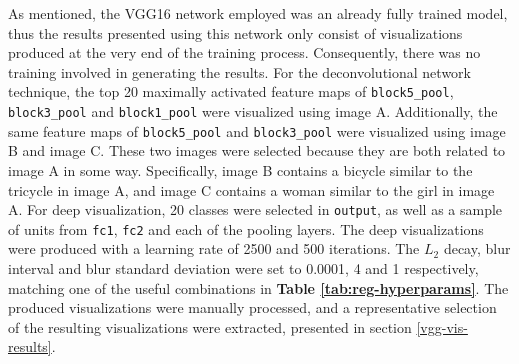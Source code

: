 \noindent As mentioned, the VGG16 network employed was an already fully trained model, thus the results presented using this network only consist of visualizations produced at the very end of the training process. Consequently, there was no training involved in generating the results. For the deconvolutional network technique, the top 20 maximally activated feature maps of \texttt{block5\_pool}, \texttt{block3\_pool} and \texttt{block1\_pool} were visualized using image A. Additionally, the same feature maps of \texttt{block5\_pool} and \texttt{block3\_pool} were visualized using image B and image C. These two images were selected because they are both related to image A in some way. Specifically, image B contains a bicycle similar to the tricycle in image A, and image C contains a woman similar to the girl in image A. For deep visualization, 20 classes were selected in \texttt{output}, as well as a sample of units from \texttt{fc1}, \texttt{fc2} and each of the pooling layers. The deep visualizations were produced with a learning rate of 2500 and 500 iterations. The $L_2$ decay, blur interval and blur standard deviation were set to 0.0001, 4 and 1 respectively, matching one of the useful combinations in \textbf{Table \ref{tab:reg-hyperparams}}. The produced visualizations were manually processed, and a representative selection of the resulting visualizations were extracted, presented in section \ref{vgg-vis-results}.

